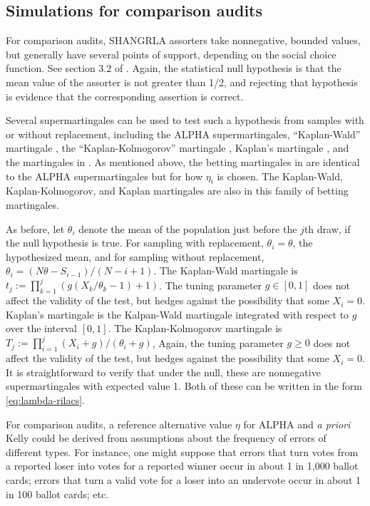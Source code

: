 \documentclass[aoas]{imsart}
\begin{document}
\subsection{Simulations for comparison audits} \label{sec:comparison-audit-sims}

For comparison audits, SHANGRLA assorters take nonnegative, bounded values, but generally have  several points of 
support, depending on the social choice function.
See section 3.2 of \citet{stark20}.
Again, the statistical null hypothesis is that the mean value of the assorter is not greater than 1/2, and rejecting that
hypothesis is evidence that the corresponding assertion is correct.

Several supermartingales can be used to test such a hypothesis from samples with or without replacement, including the ALPHA
supermartingales,
``Kaplan-Wald'' martingale \citep{stark09b}, the ``Kaplan-Kolmogorov'' martingale \citep{starkEvans19,stark20}, Kaplan's martingale 
\citep{starkEvans19,stark20},
and the martingales in \citet{waudby-smithRamdas21,waudby-smithEtal21}.
As mentioned above, the betting martingales in \citet{waudby-smithRamdas21,waudby-smithEtal21} are
identical to the ALPHA supermartingales but for how $\eta_i$ is chosen.
The Kaplan-Wald, Kaplan-Kolmogorov, and Kaplan martingales are also in this family of betting martingales.

As before, let $\theta_i$ denote the mean of the population just before the $j$th draw, if the null hypothesis is true.
For sampling with replacement, $\theta_i = \theta$, the hypothesized mean, and for sampling without replacement,
$\theta_i = (N\theta-S_{i-1})/(N-i+1)$.
The Kaplan-Wald martingale is $t_j := \prod_{k=1}^j \left (g(X_k/\theta_k - 1)+1 \right )$.
The tuning parameter $g \in [0, 1]$ does not affect the validity of the test, but hedges against the possibility that some $X_i = 0$.
Kaplan's martingale is the Kalpan-Wald martingale integrated with respect to $g$ over the interval $[0, 1]$.
The Kaplan-Kolmogorov martingale is $T_j := \prod_{i=1}^j (X_i+g)/(\theta_i+g)$, 
Again, the tuning parameter $g \ge 0$ does not affect the validity of the test, but hedges against the possibility that some $X_i = 0$.
It is straightforward to verify that under the null, these are nonnegative supermartingales with expected value 1.
Both of these can be written in the form \ref{eq:lambda-rilacs}.

For comparison audits, a reference alternative value $\eta$ for ALPHA and \emph{a priori} Kelly could be derived from assumptions about the 
frequency of errors of different types.
For instance, one might suppose that errors that turn votes from a reported loser 
into votes for a reported winner occur in about 1 in 1,000 ballot cards; errors that turn a valid vote for a loser into an 
undervote occur in about 1 in 100 ballot cards; etc.
\end{document}
